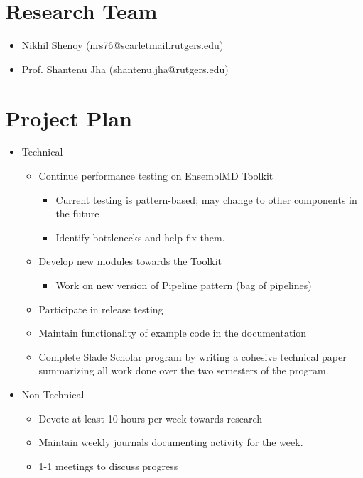 \documentclass{article}
\begin{document}
\section*{Research Team}
\begin{itemize}
	\item Nikhil Shenoy (nrs76@scarletmail.rutgers.edu)
	\item Prof. Shantenu Jha (shantenu.jha@rutgers.edu)
\end{itemize}

\section*{Project Plan}
\begin{itemize}
	\item Technical
	\begin{itemize}
		\item Continue performance testing on EnsemblMD Toolkit
		\begin{itemize}
			\item Current testing is pattern-based; may change to other components in the future
			\item Identify bottlenecks and help fix them.
		\end{itemize}
		\item Develop new modules towards the Toolkit
		\begin{itemize}
			\item Work on new version of Pipeline pattern (bag of pipelines)
		\end{itemize}
		\item Participate in release testing
		\item Maintain functionality of example code in the documentation
		\item Complete Slade Scholar program by writing a cohesive technical paper summarizing all work done over the two semesters of the program.
	\end{itemize}
	\item Non-Technical
	\begin{itemize}
		\item Devote at least 10 hours per week towards research
		\item Maintain weekly journals documenting activity for the week.
		\item 1-1 meetings to discuss progress
	\end{itemize}
\end{itemize}
\end{document}
